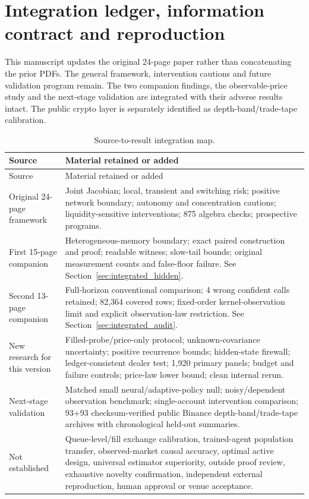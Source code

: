 \documentclass[11pt,a4paper]{article}
\theoremstyle{definition}
\theoremstyle{remark}
\begin{document}
\clearpage
\section{Integration ledger, information contract and reproduction}
\label{app:integration}
This manuscript updates the original 24-page paper rather than concatenating the prior PDFs. The general framework, intervention cautions and future validation program remain. The two companion findings, the observable-price study and the next-stage validation are integrated with their adverse results intact. The public crypto layer is separately identified as depth-band/trade-tape calibration.

\begin{longtable}{>{\raggedright\arraybackslash}p{}p{}}
\caption{Source-to-result integration map.}\\\toprule
Source & Material retained or added\\\midrule\endfirsthead
\toprule Source & Material retained or added\\\midrule\endhead
\bottomrule\endfoot
Original 24-page framework & Joint Jacobian; local, transient and switching risk; positive network boundary; autonomy and concentration cautions; liquidity-sensitive interventions; 875 algebra checks; prospective programs.\\
First 15-page companion & Heterogeneous-memory boundary; exact paired construction and proof; readable witness; slow-tail bounds; original measurement counts and false-floor failure. See Section~\ref{sec:integrated_hidden}.\\
Second 13-page companion & Full-horizon conventional comparison; 4 wrong confident calls retained; 82,364 covered rows; fixed-order kernel-observation limit and explicit observation-law restriction. See Section~\ref{sec:integrated_audit}.\\
New research for this version & Filled-probe/price-only protocol; unknown-covariance uncertainty; positive recurrence bounds; hidden-state firewall; ledger-consistent dealer test; 1,920 primary panels; budget and failure controls; price-law lower bound; clean internal rerun.\\
Next-stage validation & Matched small neural/adaptive-policy null; noisy/dependent observation benchmark; single-account intervention comparison; 93+93 checksum-verified public Binance depth-band/trade-tape archives with chronological held-out summaries.\\
Not established & Queue-level/fill exchange calibration, trained-agent population transfer, observed-market causal accuracy, optimal active design, universal estimator superiority, outside proof review, exhaustive novelty confirmation, independent external reproduction, human approval or venue acceptance.\\
\end{longtable}
\end{document}
